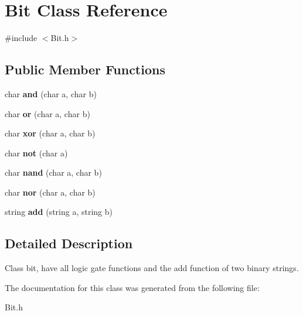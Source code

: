\hypertarget{class_bit}{\section{Bit Class Reference}
\label{class_bit}
}


{\ttfamily \#include $<$Bit.\-h$>$}

\subsection*{Public Member Functions}
\begin{DoxyCompactItemize}
\item 
\hypertarget{class_bit_ae45bf1c7553a486c5e21ea12a5a25eed}{char {\bfseries and} (char a, char b)}\label{class_bit_ae45bf1c7553a486c5e21ea12a5a25eed}

\item 
\hypertarget{class_bit_aef1cd5e14d055244f4c909fd36bbd4b2}{char {\bfseries or} (char a, char b)}\label{class_bit_aef1cd5e14d055244f4c909fd36bbd4b2}

\item 
\hypertarget{class_bit_a95cabb2e053a5fe87dfc38a271681f63}{char {\bfseries xor} (char a, char b)}\label{class_bit_a95cabb2e053a5fe87dfc38a271681f63}

\item 
\hypertarget{class_bit_a41d31a8cf804dda6a9207d14cea8a4ac}{char {\bfseries not} (char a)}\label{class_bit_a41d31a8cf804dda6a9207d14cea8a4ac}

\item 
\hypertarget{class_bit_a58fec9c5602c4f12a2c5403ea6b01a07}{char {\bfseries nand} (char a, char b)}\label{class_bit_a58fec9c5602c4f12a2c5403ea6b01a07}

\item 
\hypertarget{class_bit_a0b034a25af6dcf54f88ada1037615951}{char {\bfseries nor} (char a, char b)}\label{class_bit_a0b034a25af6dcf54f88ada1037615951}

\item 
\hypertarget{class_bit_a873b0c9067d49d989ca4f4a9b52d8a0d}{string {\bfseries add} (string a, string b)}\label{class_bit_a873b0c9067d49d989ca4f4a9b52d8a0d}

\end{DoxyCompactItemize}


\subsection{Detailed Description}
Class bit, have all logic gate functions and the add function of two binary strings. 

The documentation for this class was generated from the following file\-:\begin{DoxyCompactItemize}
\item 
Bit.\-h\end{DoxyCompactItemize}
